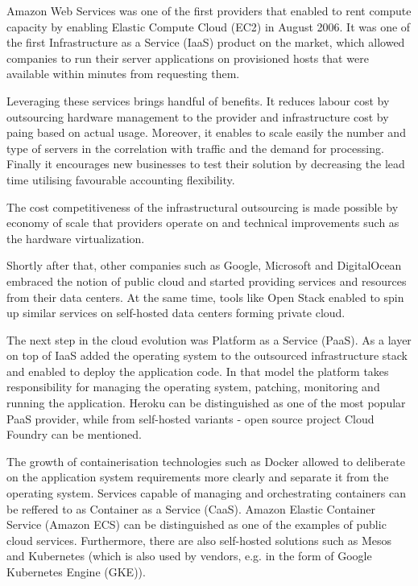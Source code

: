 Amazon Web Services was one of the first providers that enabled to rent compute capacity by enabling Elastic Compute Cloud (EC2) in August 2006. It was one of the first Infrastructure as a Service (IaaS) product on the market, which allowed companies to run their server applications on provisioned hosts that were available within minutes from requesting them. 

Leveraging these services brings handful of benefits. It reduces labour cost by outsourcing hardware management to the provider and infrastructure cost by paing based on actual usage. Moreover, it enables to scale easily the number and type of servers in the correlation with traffic and the demand for processing. Finally it encourages new businesses to test their solution by decreasing the lead time utilising favourable accounting flexibility.

The cost competitiveness of the infrastructural outsourcing is made possible by economy of scale that providers operate on and technical improvements such as the hardware virtualization.

Shortly after that, other companies such as Google, Microsoft and DigitalOcean embraced the notion of public cloud and started providing services and resources from their data centers. At the same time, tools like Open Stack enabled to spin up similar services on self-hosted data centers forming private cloud.

The next step in the cloud evolution was Platform as a Service (PaaS). As a layer on top of IaaS added the operating system to the outsourced infrastructure stack and enabled to deploy the application code. In that model the platform takes responsibility for managing the operating system, patching, monitoring and running the application. Heroku can be distinguished as one of the most popular PaaS provider, while from self-hosted variants - open source project Cloud Foundry can be mentioned.

The growth of containerisation technologies such as Docker allowed to deliberate on the application system requirements more clearly and separate it from the operating system. Services capable of managing and orchestrating containers can be reffered to as Container as a Service (CaaS). Amazon Elastic Container Service (Amazon ECS) can be distinguished as one of the examples of public cloud services.  Furthermore, there are also self-hosted solutions such as Mesos and Kubernetes (which is also used by vendors, e.g. in the form of Google Kubernetes Engine (GKE)). 

